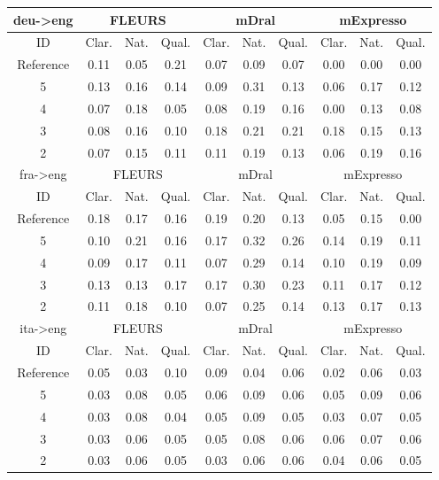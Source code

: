 \begin{table}[!ht]
\tiny
\centering
\begin{tabular}{c|ccc|ccc|ccc}
\hline
deu->eng & \multicolumn{3}{c|}{FLEURS} & \multicolumn{3}{c|}{mDral} & \multicolumn{3}{c|}{mExpresso}\\
\hline
ID & Clar. & Nat. & Qual. & Clar. & Nat. & Qual. & Clar. & Nat. & Qual. \\
\hline
Reference & 0.11 & 0.05 & 0.21 & 0.07 & 0.09 & 0.07 & 0.00 & 0.00 & 0.00\\
5 & 0.13 & 0.16 & 0.14 & 0.09 & 0.31 & 0.13 & 0.06 & 0.17 & 0.12\\
4 & 0.07 & 0.18 & 0.05 & 0.08 & 0.19 & 0.16 & 0.00 & 0.13 & 0.08\\
3 & 0.08 & 0.16 & 0.10 & 0.18 & 0.21 & 0.21 & 0.18 & 0.15 & 0.13\\
2 & 0.07 & 0.15 & 0.11 & 0.11 & 0.19 & 0.13 & 0.06 & 0.19 & 0.16\\
\hline
fra->eng & \multicolumn{3}{c|}{FLEURS} & \multicolumn{3}{c|}{mDral} & \multicolumn{3}{c|}{mExpresso}\\
\hline
ID & Clar. & Nat. & Qual. & Clar. & Nat. & Qual. & Clar. & Nat. & Qual. \\
\hline
Reference & 0.18 & 0.17 & 0.16 & 0.19 & 0.20 & 0.13 & 0.05 & 0.15 & 0.00\\
5 & 0.10 & 0.21 & 0.16 & 0.17 & 0.32 & 0.26 & 0.14 & 0.19 & 0.11\\
4 & 0.09 & 0.17 & 0.11 & 0.07 & 0.29 & 0.14 & 0.10 & 0.19 & 0.09\\
3 & 0.13 & 0.13 & 0.17 & 0.17 & 0.30 & 0.23 & 0.11 & 0.17 & 0.12\\
2 & 0.11 & 0.18 & 0.10 & 0.07 & 0.25 & 0.14 & 0.13 & 0.17 & 0.13\\
\hline
ita->eng & \multicolumn{3}{c|}{FLEURS} & \multicolumn{3}{c|}{mDral} & \multicolumn{3}{c|}{mExpresso}\\
\hline
ID & Clar. & Nat. & Qual. & Clar. & Nat. & Qual. & Clar. & Nat. & Qual. \\
\hline
Reference & 0.05 & 0.03 & 0.10 & 0.09 & 0.04 & 0.06 & 0.02 & 0.06 & 0.03\\
5 & 0.03 & 0.08 & 0.05 & 0.06 & 0.09 & 0.06 & 0.05 & 0.09 & 0.06\\
4 & 0.03 & 0.08 & 0.04 & 0.05 & 0.09 & 0.05 & 0.03 & 0.07 & 0.05\\
3 & 0.03 & 0.06 & 0.05 & 0.05 & 0.08 & 0.06 & 0.06 & 0.07 & 0.06\\
2 & 0.03 & 0.06 & 0.05 & 0.03 & 0.06 & 0.06 & 0.04 & 0.06 & 0.05\\

\end{tabular}
\end{table}
